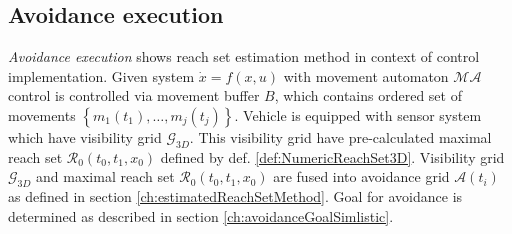 \subsection{Avoidance execution}
\noindent\textit{Avoidance execution} shows reach set estimation method in context of control implementation. Given system $\dot{x}=f(x,u)$ with movement automaton $\mathscr{MA}$ control is controlled via movement buffer $B$, which contains ordered set of movements $\left\{m_1(t_1),\dots,m_j(t_j)\right\}$. Vehicle is equipped with sensor system which have visibility grid $\mathscr{G}_{3D}$. This visibility grid have pre-calculated maximal reach set $\mathscr{R}_0(t_0,t_1,x_0)$ defined by def. \ref{def:NumericReachSet3D}. Visibility grid $\mathscr{G}_{3D}$ and maximal reach set $\mathscr{R}_0(t_0,t_1,x_0)$ are fused into avoidance grid $\mathscr{A}(t_i)$ as defined in section \ref{ch:estimatedReachSetMethod}. Goal for avoidance is determined as described in section \ref{ch:avoidanceGoalSimlistic}. 

